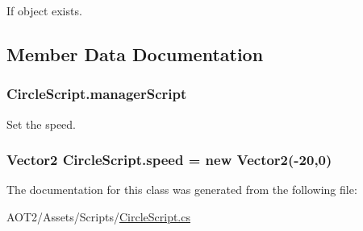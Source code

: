 If object exists. 

\subsection{Member Data Documentation}
\hypertarget{class_circle_script_ac766a11165e1111c478837fae3df9c19}{}
\subsubsection[{manager\+Script}]{ Circle\+Script.\+manager\+Script}\label{class_circle_script_ac766a11165e1111c478837fae3df9c19}


Set the speed. 

\hypertarget{class_circle_script_a4b8a0a38630b44c7e210b8b6be2549c2}{}
\subsubsection[{speed}]{\setlength{\rightskip}{0pt plus 5cm}Vector2 Circle\+Script.\+speed = new Vector2(-\/20,0)}\label{class_circle_script_a4b8a0a38630b44c7e210b8b6be2549c2}


The documentation for this class was generated from the following file\+:\begin{DoxyCompactItemize}
\item 
A\+O\+T2/\+Assets/\+Scripts/\hyperlink{_circle_script_8cs}{Circle\+Script.\+cs}\end{DoxyCompactItemize}
